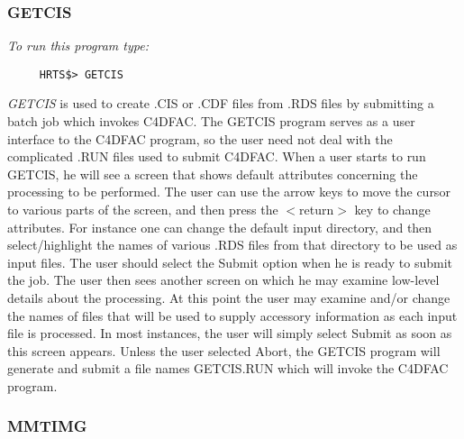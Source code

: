 \subsubsection{GETCIS}

{\em To run this program type:}
\begin{verbatim}
     HRTS$> GETCIS                  
\end{verbatim}
{\em GETCIS} is used to create .CIS or .CDF files from .RDS files by
   submitting a batch job which invokes C4DFAC.  The GETCIS program serves
   as a user interface to the C4DFAC program, so the user need not deal
   with the complicated .RUN files used to submit C4DFAC.  When a user
   starts to run GETCIS, he will see a screen that shows default
   attributes concerning the processing to be performed.
   The user can use the arrow keys to move the cursor to various parts
   of the screen, and then press the $<$return$>$ key to change attributes.
   For instance one can change the default input directory, and then
   select/highlight the names of various .RDS files from that directory to
   be used as input files.  The user should select the Submit option when
   he is ready to submit the job.
      The user then sees another screen on which he may examine low-level
   details about the processing.
   At this point the user may examine and/or change the names of files
   that will be used to supply accessory information as each input file is
   processed.  In most instances, the user will simply select Submit as
   soon as this screen appears.
   Unless the user selected Abort, the GETCIS program will generate and
   submit a file names GETCIS.RUN which will invoke the C4DFAC program.

\subsubsection{MMTIMG}

